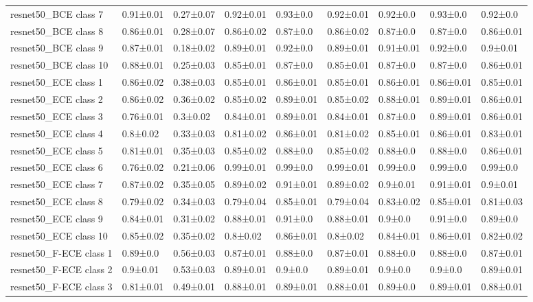 \begin{tabular}{lllllllll}
resnet50_BCE class 7 & 0.91±0.01 & 0.27±0.07 & 0.92±0.01 & 0.93±0.0 & 0.92±0.01 & 0.92±0.0 & 0.93±0.0 & 0.92±0.0 \\
resnet50_BCE class 8 & 0.86±0.01 & 0.28±0.07 & 0.86±0.02 & 0.87±0.0 & 0.86±0.02 & 0.87±0.0 & 0.87±0.0 & 0.86±0.01 \\
resnet50_BCE class 9 & 0.87±0.01 & 0.18±0.02 & 0.89±0.01 & 0.92±0.0 & 0.89±0.01 & 0.91±0.01 & 0.92±0.0 & 0.9±0.01 \\
resnet50_BCE class 10 & 0.88±0.01 & 0.25±0.03 & 0.85±0.01 & 0.87±0.0 & 0.85±0.01 & 0.87±0.0 & 0.87±0.0 & 0.86±0.01 \\
resnet50_ECE class 1 & 0.86±0.02 & 0.38±0.03 & 0.85±0.01 & 0.86±0.01 & 0.85±0.01 & 0.86±0.01 & 0.86±0.01 & 0.85±0.01 \\
resnet50_ECE class 2 & 0.86±0.02 & 0.36±0.02 & 0.85±0.02 & 0.89±0.01 & 0.85±0.02 & 0.88±0.01 & 0.89±0.01 & 0.86±0.01 \\
resnet50_ECE class 3 & 0.76±0.01 & 0.3±0.02 & 0.84±0.01 & 0.89±0.01 & 0.84±0.01 & 0.87±0.0 & 0.89±0.01 & 0.86±0.01 \\
resnet50_ECE class 4 & 0.8±0.02 & 0.33±0.03 & 0.81±0.02 & 0.86±0.01 & 0.81±0.02 & 0.85±0.01 & 0.86±0.01 & 0.83±0.01 \\
resnet50_ECE class 5 & 0.81±0.01 & 0.35±0.03 & 0.85±0.02 & 0.88±0.0 & 0.85±0.02 & 0.88±0.0 & 0.88±0.0 & 0.86±0.01 \\
resnet50_ECE class 6 & 0.76±0.02 & 0.21±0.06 & 0.99±0.01 & 0.99±0.0 & 0.99±0.01 & 0.99±0.0 & 0.99±0.0 & 0.99±0.0 \\
resnet50_ECE class 7 & 0.87±0.02 & 0.35±0.05 & 0.89±0.02 & 0.91±0.01 & 0.89±0.02 & 0.9±0.01 & 0.91±0.01 & 0.9±0.01 \\
resnet50_ECE class 8 & 0.79±0.02 & 0.34±0.03 & 0.79±0.04 & 0.85±0.01 & 0.79±0.04 & 0.83±0.02 & 0.85±0.01 & 0.81±0.03 \\
resnet50_ECE class 9 & 0.84±0.01 & 0.31±0.02 & 0.88±0.01 & 0.91±0.0 & 0.88±0.01 & 0.9±0.0 & 0.91±0.0 & 0.89±0.0 \\
resnet50_ECE class 10 & 0.85±0.02 & 0.35±0.02 & 0.8±0.02 & 0.86±0.01 & 0.8±0.02 & 0.84±0.01 & 0.86±0.01 & 0.82±0.02 \\
resnet50_F-ECE class 1 & 0.89±0.0 & 0.56±0.03 & 0.87±0.01 & 0.88±0.0 & 0.87±0.01 & 0.88±0.0 & 0.88±0.0 & 0.87±0.01 \\
resnet50_F-ECE class 2 & 0.9±0.01 & 0.53±0.03 & 0.89±0.01 & 0.9±0.0 & 0.89±0.01 & 0.9±0.0 & 0.9±0.0 & 0.89±0.01 \\
resnet50_F-ECE class 3 & 0.81±0.01 & 0.49±0.01 & 0.88±0.01 & 0.89±0.01 & 0.88±0.01 & 0.89±0.0 & 0.89±0.01 & 0.88±0.01 \\

\end{tabular}
